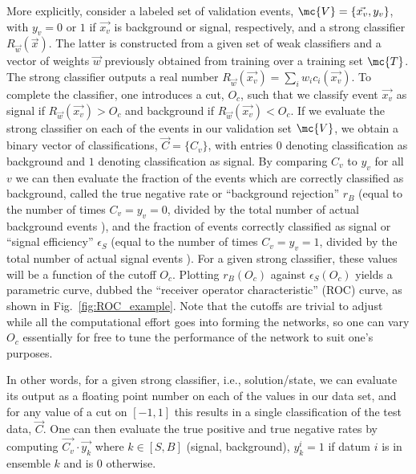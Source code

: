 More explicitly, consider a labeled set of validation events, $\mc{V}=\{\vec{x_v},y_v\}$, with $y_v=0$ or $1$ if $\vec{x_v}$ is background or signal, respectively, and a strong classifier $R_{\vec{w}}(\vec{x})$. The latter is constructed from a given set of weak classifiers and a vector of weights $\vec{w}$ previously obtained from training over a training set $\mc{T}$. The strong classifier outputs a real number $R_{\vec{w}}(\vec{x_v})=\sum_i w_i c_i(\vec{x_v})$. To complete the classifier, one introduces a cut, $O_c$, such that we classify event $\vec{x_v}$ as signal if $R_{\vec{w}}(\vec{x_v})>O_c$ and background if $R_{\vec{w}}(\vec{x_v})<O_c$. If we evaluate the strong classifier on each of the events in our validation set $\mc{V}$, we obtain a binary vector of classifications, $\vec{C}=\{C_v\}$, with entries $0$ denoting classification as background and $1$ denoting classification as signal. By comparing $C_v$ to $y_v$ for all $v$ we can then evaluate the fraction of the events which are correctly classified as background, called the true negative rate or ``background rejection'' $r_B$ (equal to the number of times $C_v=y_v=0$, divided by the total number of actual background events
%
), 
and the fraction of events correctly classified as signal or ``signal efficiency'' $\epsilon_S$ (equal to the number of times $C_v=y_v=1$, divided by the total number of actual signal events%
). 
For a given strong classifier, these values will be a function of the cutoff $O_c$. Plotting $r_B(O_c)$ against $\epsilon_S(O_c)$ yields a parametric curve, dubbed the ``receiver operator characteristic'' (ROC) curve, as shown in Fig.~\ref{fig:ROC_example}. Note that the cutoffs are trivial to adjust while all the computational effort goes into forming the networks, so one can vary $O_c$ essentially for free to tune the performance of the network to suit one's purposes. 

In other words, for a given strong classifier, i.e., solution/state, we can evaluate its output as a floating point number on each of the values in our data set, and for any value of a cut on $[-1,1]$ this results in a single classification of the test data, $\vec{C}$. One can then evaluate the true positive and true negative rates by computing $\vec{C_v}\cdot\vec{y_k}$ where $k\in [S,B]$ (signal, background), $y_k^i=1$ if datum $i$ is in ensemble $k$ and is $0$ otherwise. 

